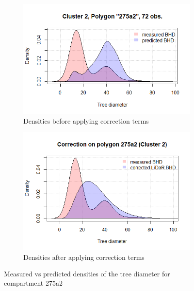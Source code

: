 \begin{figure}[H]
\centering
\begin{subfigure}{.5\textwidth}
  \centering
  \includegraphics[width=.9\linewidth]{cluster2_275a2_72.png}
  \caption{Densities before applying correction terms}
  \label{fig:polygon_before_275a2}
\end{subfigure}%
\begin{subfigure}{.5\textwidth}
  \centering
  \includegraphics[width=0.837\linewidth]{corrected_cluster2_275a2.png}
  \caption{Densities after applying correction terms}
  \label{fig:polygon_after_275a2}
\end{subfigure}
\caption{Measured vs predicted densities of the tree diameter for compartment 275a2}
\label{fig:correction_polygon_275a2}
\end{figure}

